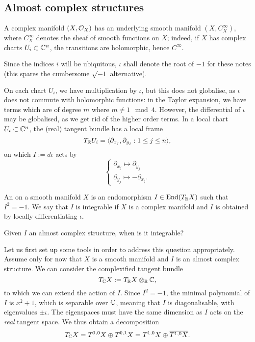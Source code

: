 \subsection{Almost complex structures}
A complex manifold $(X,\mathcal{O}_X)$ has an underlying smooth manifold $(X, C^\infty_X)$, where $C^\infty_X$ denotes the sheaf of smooth functions on $X$; indeed, if $X$ has complex charts $U_i\subset \mathbb C^n$, the transitions are holomorphic, hence $C^\infty$. 
\begin{notation}
	Since the indices $i$ will be ubiquitous, $\iota$ shall denote the root of $-1$ for these notes (this spares the cumbersome $\sqrt{-1}$ alternative).
\end{notation}
On each chart $U_i$, we have multiplication by $\iota$, but this does not globalise, as $\iota$ does not commute with holomorphic functions: in the Taylor expansion, we have terms which are of degree $m$ where $m\neq 1\mod 4$. However, the differential of $\iota$ may be globalised, as we get rid of the higher order terms. In a local chart $U_i\subset \mathbb C^n$, the (real) tangent bundle has a local frame
\[
T_\mathbb R U_i=\langle \partial_{x_j},\partial_{y_j}:1\leq j\leq n\rangle,
\]
on which $I:=d\iota$ acts by
\[
\begin{cases}
	\partial_{x_j}\mapsto \partial_{y_j}\\
	\partial_{y_j}\mapsto -\partial_{x_j}.
\end{cases}
\]
\begin{definition}
	An  on a smooth manifold $X$ is an endomorphism $I\in \text{End}(T_\mathbb R X)$ such that $I^2=-1$. We say that $I$ is integrable if $X$ is a complex manifold and $I$ is obtained by locally differentiating $\iota$. 
\end{definition}
\begin{question}\label{q: integrable?}
	Given $I$ an almost complex structure, when is it integrable?
\end{question}
Let us first set up some tools in order to address this question appropriately. Assume only for now that $X$ is a smooth manifold and $I$ is an almost complex structure. We can consider the complexified tangent bundle 
\[
T_\mathbb C X:=T_\mathbb R X\otimes_\mathbb R \mathbb C,
\]
to which we can extend the action of $I$. Since $I^2={-1}$, the minimal polynomial of $I$ is $x^2+1$, which is separable over $\mathbb C$, meaning that $I$ is diagonalisable, with eigenvalues $\pm \iota$. The eigenspaces must have the same dimension as $I$ acts on the \emph{real} tangent space. We thus obtain a decomposition
\[
T_\mathbb C X=T^{1,0}X\oplus T^{0,1}X= T^{1,0}X\oplus \overline{T^{1,0}X}.
\]
